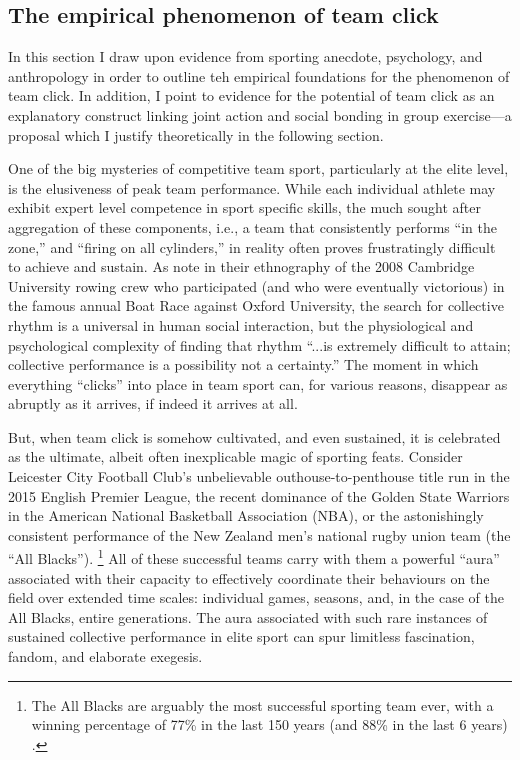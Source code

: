 \begin{CJK}{UTF8}{gbsn}
\section{The empirical phenomenon of team click \label{sect:teamClickIntro}}
In this section I draw upon evidence from sporting anecdote, psychology, and anthropology in order to outline teh empirical foundations for the phenomenon of team click.  In addition, I point to evidence for the potential of team click as an explanatory construct linking joint action and social bonding in group exercise---a proposal which I justify theoretically in the following section.

One of the big mysteries of competitive team sport, particularly at the elite level, is the elusiveness of peak team performance.  While each individual athlete may exhibit expert level competence in sport specific skills, the much sought after aggregation of these components, i.e., a team that consistently performs ``in the zone,'' and ``firing on all cylinders,'' in reality often proves frustratingly difficult to achieve and sustain.  As \textcite[568]{King2011} note in their ethnography of the 2008 Cambridge University rowing crew who participated (and who were eventually victorious) in the famous annual Boat Race against Oxford University, the search for collective rhythm is a universal in human social interaction, but  the physiological and psychological complexity of finding that rhythm ``...is extremely difficult to attain; collective performance is a possibility not a certainty.''   The moment in which everything ``clicks'' into place in team sport can, for various reasons, disappear as abruptly as it arrives, if indeed it arrives at all.

But, when team click is somehow cultivated, and even sustained, it is celebrated as the ultimate, albeit often inexplicable magic of sporting feats. Consider Leicester City Football Club's unbelievable outhouse-to-penthouse title run in the 2015 English Premier League, the recent dominance of the Golden State Warriors in the American National Basketball Association (NBA), or the astonishingly consistent performance of the New Zealand men's national rugby union team (the ``All Blacks'').
    \footnote{The All Blacks are arguably the most successful sporting team ever, with a winning percentage of 77\% in the last 150 years (and 88\% in the last 6 years) \citep{Kerr2013}.}
All of these successful teams carry with them a powerful ``aura'' associated with their capacity to effectively coordinate their behaviours on the field over extended time scales: individual games, seasons, and, in the case of the All Blacks, entire generations.  The aura associated with such rare instances of sustained collective performance in elite sport can spur limitless fascination, fandom, and elaborate exegesis.


\end{CJK}
